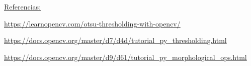 \documentclass[a4]{article}
\begin{document}
\begin{figure}[H]
	\label{fig:prep_bounding_box}
\end{figure}

\underline{Referencias:}

\href{https://learnopencv.com/otsu-thresholding-with-opencv/}{https://learnopencv.com/otsu-thresholding-with-opencv/}    

\href{https://docs.opencv.org/master/d7/d4d/tutorial_py_thresholding.html}{https://docs.opencv.org/master/d7/d4d/tutorial\_py\_thresholding.html}

\href{https://docs.opencv.org/master/d9/d61/tutorial_py_morphological_ops.html}{https://docs.opencv.org/master/d9/d61/tutorial\_py\_morphological\_ops.html}
\end{document}
